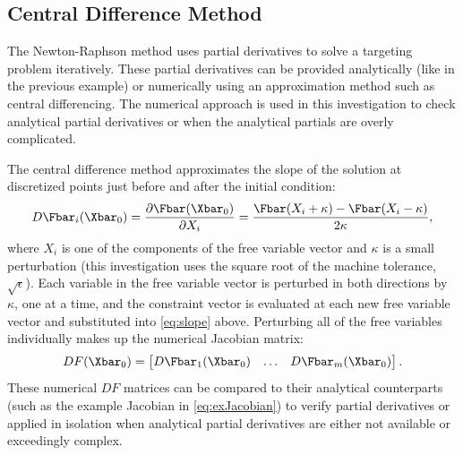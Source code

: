 \subsection{Central Difference Method}
The Newton-Raphson method uses partial derivatives to solve a targeting problem iteratively. These
partial derivatives can be provided analytically (like in the previous example) or numerically
using an approximation method such as central differencing. The numerical approach is used in this
investigation to check analytical partial derivatives or when the analytical partials are overly
complicated.

The central difference method approximates the slope of the solution at discretized points just
before and after the initial condition:
\begin{equation}
    D\Fbar_{i}(\Xbar_{0})=\frac{\partial\Fbar(\Xbar_{0})}{\partial X_{i}}=\frac{\Fbar(X_{i}+\kappa)-\Fbar(X_{i}-\kappa)}{2\kappa},
    \label{eq:slope}
\end{equation}
where $X_{i}$ is one of the components of the free variable vector and $\kappa$ is a small
perturbation (this investigation uses the square root of the machine tolerance, $\sqrt{\epsilon}$).
Each variable in the free variable vector is perturbed in both directions by $\kappa$, one at a
time, and the constraint vector is evaluated at each new free variable vector and substituted into
\cref{eq:slope} above. Perturbing all of the free variables individually makes up the numerical
Jacobian matrix:
\begin{equation}
    DF(\Xbar_{0})=\begin{bmatrix}   D\Fbar_{1}(\Xbar_{0})   &   \dots   &   D\Fbar_{m}(\Xbar_{0})\end{bmatrix}.
    \label{eq:centraldifference}
\end{equation}
These numerical $DF$ matrices can be compared to their analytical counterparts (such as the example
Jacobian in \cref{eq:exJacobian}) to verify partial derivatives or applied in isolation when
analytical partial derivatives are either not available or exceedingly complex.
